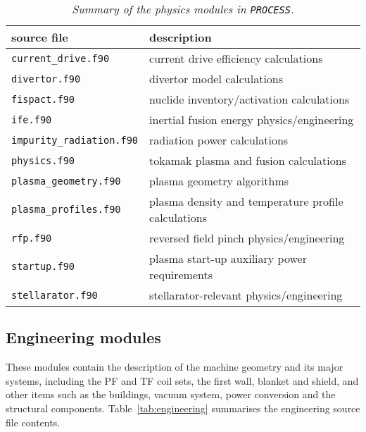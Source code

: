 \documentclass[11pt,a4paper]{report}
\newcommand{\process}{\mbox{\texttt{PROCESS}}}
\begin{document}
\begin{table}[tbph]
\begin{center}

\begin{tabular}{||l||l||} \hline
source file   & description \\ \hline
\texttt{current\_drive.f90} & current drive efficiency calculations \\
\texttt{divertor.f90} & divertor model calculations\\
\texttt{fispact.f90} & nuclide inventory/activation calculations \\
\texttt{ife.f90} & inertial fusion energy physics/engineering \\
\texttt{impurity\_radiation.f90} & radiation power calculations \\
\texttt{physics.f90} & tokamak plasma and fusion calculations \\
\texttt{plasma\_geometry.f90} & plasma geometry algorithms \\
\texttt{plasma\_profiles.f90} & plasma density and temperature profile calculations \\
\texttt{rfp.f90} & reversed field pinch physics/engineering \\
\texttt{startup.f90} & plasma start-up auxiliary power requirements \\
\texttt{stellarator.f90 } & stellarator-relevant physics/engineering \\
\hline
\end{tabular}
\end{center}
\caption[Summary of physics modules]
{\label{tab:physics}
  \textit{Summary of the physics modules in \process.}
}
\end{table}

\subsection{Engineering modules}

These modules contain the description of the machine geometry and its major
systems, including the PF and TF coil sets, the first wall, blanket and
shield, and other items such as the buildings, vacuum system, power conversion
and the structural components.  Table~\ref{tab:engineering} summarises the
engineering source file contents.
\end{document}
